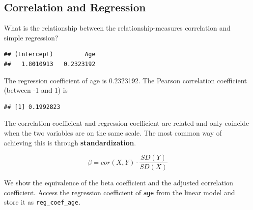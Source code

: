 \documentclass[
]{book}
\newenvironment{Shaded}{\begin{snugshade}}{\end{snugshade}}
\newcommand{\AttributeTok}[1]{\textcolor[rgb]{0.77,0.63,0.00}{#1}}
\newcommand{\CommentTok}[1]{\textcolor[rgb]{0.56,0.35,0.01}{\textit{#1}}}
\newcommand{\DecValTok}[1]{\textcolor[rgb]{0.00,0.00,0.81}{#1}}
\newcommand{\FunctionTok}[1]{\textcolor[rgb]{0.00,0.00,0.00}{#1}}
\newcommand{\NormalTok}[1]{#1}
\newcommand{\OtherTok}[1]{\textcolor[rgb]{0.56,0.35,0.01}{#1}}
\newcommand{\SpecialCharTok}[1]{\textcolor[rgb]{0.00,0.00,0.00}{#1}}
\newcommand{\StringTok}[1]{\textcolor[rgb]{0.31,0.60,0.02}{#1}}
\begin{document}
\hypertarget{correlation-and-regression}{%
\subsection{Correlation and Regression}\label{correlation-and-regression}}

What is the relationship between the relationship-measures correlation and simple regression?

\begin{Shaded}
\end{Shaded}

\begin{verbatim}
## (Intercept)         Age 
##   1.8010913   0.2323192
\end{verbatim}

The regression coefficient of age is 0.2323192. The Pearson correlation coefficient (between -1 and 1) is

\begin{Shaded}
\end{Shaded}

\begin{verbatim}
## [1] 0.1992823
\end{verbatim}

The correlation coefficient and regression coefficient are related and only coincide when the two variables are on the same scale. The most common way of achieving this is through \textbf{standardization}.

\[\beta = cor(X,Y) \cdot \frac{SD(Y)}{SD(X)} \]

We show the equivalence of the beta coefficient and the adjusted correlation coefficient. Access the regression coefficient of \texttt{age} from the linear model and store it as \texttt{reg\_coef\_age}.

\begin{Shaded}
\end{Shaded}
\end{document}
